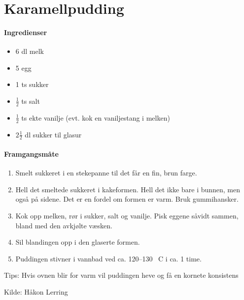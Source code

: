 \section{Karamellpudding}

\paragraph{Ingredienser}
\begin{itemize}[noitemsep]
	\item 6 dl melk
	\item 5 egg
	\item 1 ts sukker
	\item $\frac{1}{2}$ ts salt
	\item $\frac{1}{2}$ ts ekte vanilje (evt. kok en vaniljestang i melken)
	\item $2 \frac{1}{2}$ dl sukker til glasur
\end{itemize}

\paragraph{Framgangsmåte}
\begin{enumerate}
	\item Smelt sukkeret i en stekepanne til det får en fin, brun farge. \item Hell det smeltede sukkeret i kakeformen. Hell det ikke bare i bunnen, men også på sidene. Det er en fordel om formen er varm. Bruk gummihansker.
	\item Kok opp melken, rør i sukker, salt og vanilje. Pisk eggene såvidt sammen, bland med den avkjølte væsken.
	\item Sil blandingen opp i den glaserte formen.
	\item Puddingen stivner i vannbad ved ca. 120--130 \degree~C i ca. 1 time.

\end{enumerate}


Tips: Hvis ovnen blir for varm vil puddingen heve og få en kornete konsistens


Kilde: Håkon Lerring
